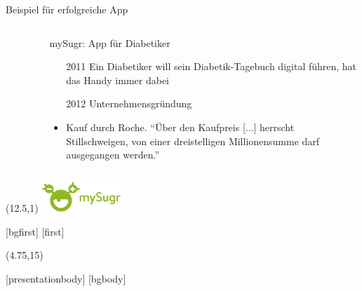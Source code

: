 \begin{frame}{Beispiel für erfolgreiche App}
\begin{columns}
\begin{column}{0.6\textwidth}
\begin{figure}
            \end{figure}    
        \end{column}
        \begin{column}{0.4\textwidth}
            \noindent mySugr: App für Diabetiker
            \begin{itemize}
                \item[2011] Ein Diabetiker will sein Diabetik-Tagebuch digital führen, hat das Handy immer dabei
                \item[2012] Unternehmensgründung
                \item<2->[2017] Kauf durch Roche. ``Über den Kaufpreis [...] herrscht Stillschweigen, von einer dreistelligen Millionensumme darf ausgegangen werden.'' \cite{mysugrverkauf}
            \end{itemize}
        \end{column}
    \end{columns}
    \begin{textblock}{15}(12.5,1)
        \includegraphics[width=3cm]{Bilder/mysugrlogo.png}
    \end{textblock}
\end{frame}


[bgfirst]
[first]
\subtitle{\theslidesection: Technische Grundlagen}
\begin{frame}[noframenumbering]
    \titlepage
    \begin{textblock}{10}(4.75,15)
        \cite{ProgrammingLogo}
    \end{textblock}
\end{frame}
[presentationbody] 
[bgbody]


